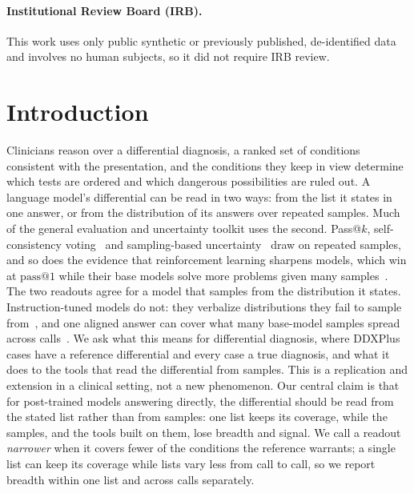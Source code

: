 \documentclass[wcp]{jmlr}
\makeatletter
\newcommand{\passk}[1]{\mathrm{pass@}#1}
\makeatother
\begin{document}
\paragraph{Institutional Review Board (IRB).}
This work uses only public synthetic or previously published, de-identified data and involves no human subjects, so it did not require IRB review.

\section{Introduction}\label{pg:mainstart}
Clinicians reason over a differential diagnosis, a ranked set of conditions consistent with the presentation, and the conditions they keep in view determine which tests are ordered and which dangerous possibilities are ruled out.
A language model's differential can be read in two ways: from the list it states in one answer, or from the distribution of its answers over repeated samples.
Much of the general evaluation and uncertainty toolkit uses the second. Pass@$k$, self-consistency voting~\citep{wang2023selfconsistency} and sampling-based uncertainty~\citep{kuhn2023semantic,farquhar2024semanticentropy} draw on repeated samples, and so does the evidence that reinforcement learning sharpens models, which win at $\passk{1}$ while their base models solve more problems given many samples~\citep{yue2025rlboundary,wu2025invisibleleash,oh2026sharpeningtax}.
The two readouts agree for a model that samples from the distribution it states. Instruction-tuned models do not: they verbalize distributions they fail to sample from~\citep{meister2025distributional,zhang2025verbalized,jang2026cannotsample}, and one aligned answer can cover what many base-model samples spread across calls~\citep{lake2025overton}. We ask what this means for differential diagnosis, where DDXPlus cases have a reference differential and every case a true diagnosis, and what it does to the tools that read the differential from samples. This is a replication and extension in a clinical setting, not a new phenomenon. Our central claim is that for post-trained models answering directly, the differential should be read from the stated list rather than from samples: one list keeps its coverage, while the samples, and the tools built on them, lose breadth and signal. We call a readout \emph{narrower} when it covers fewer of the conditions the reference warrants; a single list can keep its coverage while lists vary less from call to call, so we report breadth within one list and across calls separately.
\end{document}
